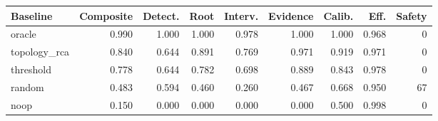 \begin{tabular}{lrrrrrrrr}
\toprule
Baseline & Composite & Detect. & Root & Interv. & Evidence & Calib. & Eff. & Safety \\
\midrule
oracle & 0.990 & 1.000 & 1.000 & 0.978 & 1.000 & 1.000 & 0.968 & 0 \\
topology\_rca & 0.840 & 0.644 & 0.891 & 0.769 & 0.971 & 0.919 & 0.971 & 0 \\
threshold & 0.778 & 0.644 & 0.782 & 0.698 & 0.889 & 0.843 & 0.978 & 0 \\
random & 0.483 & 0.594 & 0.460 & 0.260 & 0.467 & 0.668 & 0.950 & 67 \\
noop & 0.150 & 0.000 & 0.000 & 0.000 & 0.000 & 0.500 & 0.998 & 0 \\
\bottomrule
\end{tabular}
